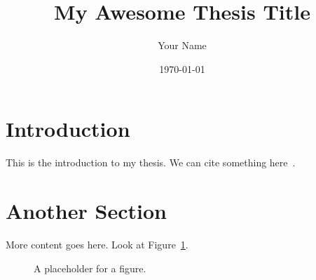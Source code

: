 \documentclass{article} %
\title{My Awesome Thesis Title}
\author{Your Name}
\date{\today}
\begin{document}
\maketitle

\section{Introduction}
This is the introduction to my thesis.
We can cite something here~\cite{example_key}.

\section{Another Section}
More content goes here.
Look at Figure~\ref{fig:myfigure}.

\begin{figure}[htbp]
    \centering
    \caption{A placeholder for a figure.}
    \label{fig:myfigure}
\end{figure}

\printbibliography
\end{document}
